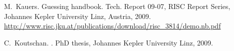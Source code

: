 \documentclass[10pt,a4paper]{article}
\begin{document}
\begin{thebibliography}{10}




M.~Kauers.
\newblock Guessing handbook.
\newblock Tech. Report 09-07, RISC Report Series, Johannes Kepler University Linz, Austria, 2009. \\
\href{http://www.risc.jku.at/publications/download/risc_3814/demo.nb.pdf}{http:/$\!$/www.risc.jku.at/publications/download/risc\_3814/demo.nb.pdf}

% 
% 
% 
C.~Koutschan.
.
\newblock PhD thesis, Johannes Kepler University Linz, 2009.


\end{thebibliography}
\end{document}
